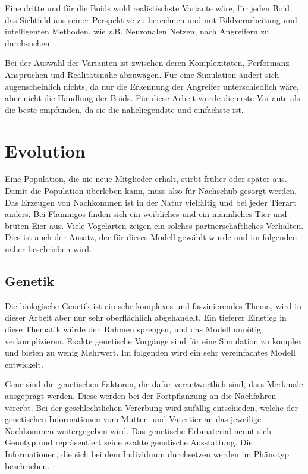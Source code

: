 \documentclass[draft=false
              ,paper=a4
              ,twoside=false
              ,fontsize=11pt
              ,headsepline
              ,BCOR10mm
              ,DIV11
              ,bibtotoc
              ,liststotoc
              ]{scrbook}
\begin{document}
Eine dritte und für die Boids wohl realistischste Variante wäre, für jeden Boid das Sichtfeld aus seiner Perspektive zu berechnen und mit Bildverarbeitung und intelligenten Methoden, wie z.B. Neuronalen Netzen, nach Angreifern zu durchsuchen.

Bei der Auswahl der Varianten ist zwischen deren Komplexitäten, Performanz-Ansprüchen und Realitätsnähe abzuwägen. Für eine Simulation ändert sich augenscheinlich nichts, da nur die Erkennung der Angreifer unterschiedlich wäre, aber nicht die Handlung der Boids. Für diese Arbeit wurde die erste Variante als die beste empfunden, da sie die naheliegendste und einfachste ist.

\section{Evolution}
Eine Population, die nie neue Mitglieder erhält, stirbt früher oder später aus. Damit die Population überleben kann, muss also für Nachschub gesorgt werden. Das Erzeugen von Nachkommen ist in der Natur vielfältig und bei jeder Tierart anders. Bei Flamingos finden sich ein weibliches und ein männliches Tier und brüten Eier aus. Viele Vogelarten zeigen ein solches partnerschaftliches Verhalten. Dies ist auch der Ansatz, der für dieses Modell gewählt wurde und im folgenden näher beschrieben wird.

\subsection{Genetik}
Die biologische Genetik ist ein sehr komplexes und faszinierendes Thema, wird in dieser Arbeit aber nur sehr oberflächlich abgehandelt. Ein tieferer Einstieg in diese Thematik würde den Rahmen sprengen, und das Modell unnötig verkomplizieren. Exakte genetische Vorgänge sind für eine Simulation zu komplex und bieten zu wenig Mehrwert. Im folgenden wird ein sehr vereinfachtes Modell entwickelt.

Gene sind die genetischen Faktoren, die dafür verantwortlich sind, dass Merkmale ausgeprägt werden. Diese werden bei der Fortpflanzung an die Nachfahren vererbt. Bei der geschlechtlichen Vererbung wird zufällig entschieden, welche der genetischen Informationen vom Mutter- und Vatertier an das jeweilige Nachkommen weitergegeben wird. Das genetische Erbmaterial nennt sich Genotyp und repräsentiert seine exakte genetische Ausstattung. Die Informationen, die sich bei dem Individuum durchsetzen werden im Phänotyp beschrieben.
\end{document}
